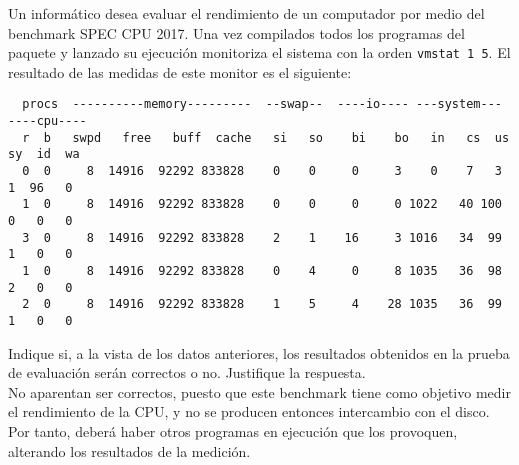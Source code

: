 \begin{comment}
    Solución:
    \begin{enumerate}
        \item Deberíamos optimizar \verb|reduce()| ya que su código propio consume casi el 60\% de tiempo de CPU del programa.
        \item El programa se ejecutaría en 28,22 s.
        \item El programa se ejecutaría 1,33 veces más rápidamente.
        \item La máxima ganancia en velocidad que se podría conseguir es 1,49.
    \end{enumerate}
\end{comment}

\begin{ejercicio}
    Un informático desea evaluar el rendimiento de un computador por medio del benchmark SPEC CPU 2017. Una vez compilados todos los programas del paquete y lanzado su ejecución monitoriza el sistema con la orden \verb|vmstat 1 5|. El resultado de las medidas de este monitor es el siguiente:
    \begin{verbatim}
  procs  ----------memory---------  --swap--  ----io---- ---system---  ----cpu----
  r  b   swpd   free   buff  cache   si   so    bi    bo   in   cs  us  sy  id  wa
  0  0     8  14916  92292 833828    0    0     0     3    0    7   3   1  96   0
  1  0     8  14916  92292 833828    0    0     0     0 1022   40 100   0   0   0
  3  0     8  14916  92292 833828    2    1    16     3 1016   34  99   1   0   0
  1  0     8  14916  92292 833828    0    4     0     8 1035   36  98   2   0   0
  2  0     8  14916  92292 833828    1    5     4    28 1035   36  99   1   0   0
    \end{verbatim}

    Indique si, a la vista de los datos anteriores, los resultados obtenidos en la prueba de evaluación serán correctos o no. Justifique la respuesta.\\

    No aparentan ser correctos, puesto que este benchmark tiene como objetivo medir el rendimiento de la CPU, y no se producen entonces intercambio con el disco. Por tanto, deberá haber otros programas en ejecución que los provoquen, alterando los resultados de la medición.
\end{ejercicio}
\begin{comment}
    Solución: El sistema operativo presenta actividad de intercambio con el disco y ninguno de los programas del benchmark debería provocarlos.
\end{comment}

